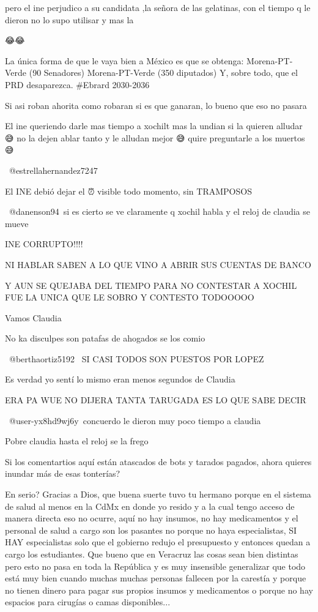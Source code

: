 pero el ine perjudico a su candidata ,la señora de las gelatinas,  con el tiempo q le dieron no lo supo utilisar y mas la 💩🤦🏻‍♀️

😂😂

La única forma de que le vaya bien a México es que se obtenga:
Morena-PT-Verde (90 Senadores)
Morena-PT-Verde (350 diputados)
Y, sobre todo, que el PRD desaparezca.
#Ebrard 2030-2036

Si asi roban ahorita como robaran si es que ganaran, lo bueno que eso no pasara

El ine queriendo darle mas tiempo a xochilt mas la undian si la quieren alludar 😅 no la dejen ablar tanto y le alludan mejor 😅 quire preguntarle a los muertos 😅

 @estrellahernandez7247  🤣

El INE debió dejar el ⏰ visible todo momento, sin TRAMPOSOS

​ @danenson94 si es cierto se ve claramente q xochil habla y el reloj de claudia se mueve

INE CORRUPTO!!!!

NI HABLAR SABEN A LO QUE VINO A ABRIR SUS CUENTAS DE BANCO

Y AUN SE QUEJABA DEL TIEMPO PARA NO CONTESTAR A XOCHIL FUE LA UNICA QUE LE SOBRO Y CONTESTO TODOOOOO

Vamos Claudia 💪💪💪💪💪

No ka disculpes son patafas de ahogados se los comio

 @berthaortiz5192  SI CASI TODOS SON PUESTOS  POR LOPEZ

Es verdad yo sentí lo mismo eran menos segundos de Claudia

ERA PA WUE NO DIJERA TANTA TARUGADA ES LO QUE SABE DECIR

​ @user-yx8hd9wj6y concuerdo le dieron muy poco tiempo a claudia

Pobre claudia hasta el reloj se la frego

Si los comentartios aquí están atascados de bots y tarados pagados, ahora quieres inundar más de esas tonterías?

En serio? Gracias a Dios, que buena suerte tuvo tu hermano porque en el sistema de salud al menos en la CdMx en donde yo resido y a la cual tengo acceso de manera directa eso no ocurre, aquí no hay insumos, no hay medicamentos y el personal de salud a cargo son los pasantes no porque no haya especialistas, SI HAY especialistas solo que el gobierno redujo el presupuesto y entonces quedan a cargo los estudiantes. 
Que bueno que en Veracruz las cosas sean bien distintas pero esto no pasa en toda la República y es muy insensible generalizar que todo está muy bien cuando muchas muchas personas fallecen por la carestía y porque no tienen dinero para pagar sus propios insumos y medicamentos o porque no hay espacios para cirugías o camas disponibles...

